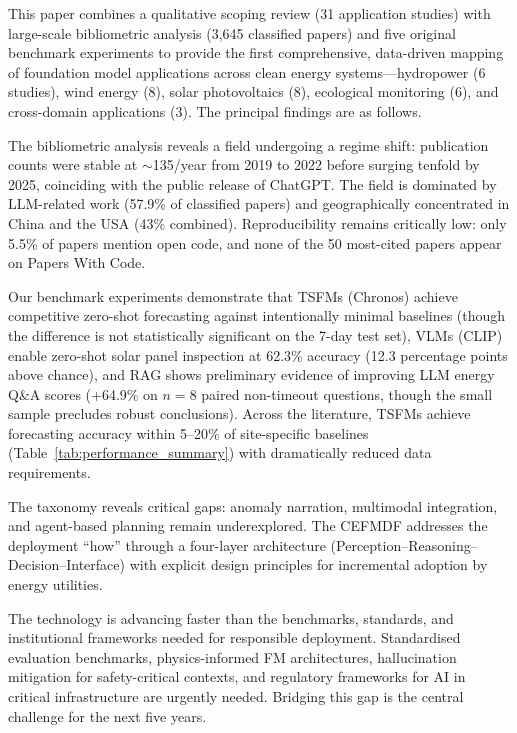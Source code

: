 \documentclass[preprint,12pt]{elsarticle}
\begin{document}
This paper combines a qualitative scoping review (31 application studies) with large-scale bibliometric analysis (3{,}645 classified papers) and five original benchmark experiments to provide the first comprehensive, data-driven mapping of foundation model applications across clean energy systems---hydropower (6 studies), wind energy (8), solar photovoltaics (8), ecological monitoring (6), and cross-domain applications (3). The principal findings are as follows.

The bibliometric analysis reveals a field undergoing a regime shift: publication counts were stable at ${\sim}$135/year from 2019 to 2022 before surging tenfold by 2025, coinciding with the public release of ChatGPT. The field is dominated by LLM-related work (57.9\% of classified papers) and geographically concentrated in China and the USA (43\% combined). Reproducibility remains critically low: only 5.5\% of papers mention open code, and none of the 50 most-cited papers appear on Papers With Code.

{ Our benchmark experiments demonstrate that TSFMs (Chronos) achieve competitive zero-shot forecasting against intentionally minimal baselines (though the difference is not statistically significant on the 7-day test set), VLMs (CLIP) enable zero-shot solar panel inspection at 62.3\% accuracy (12.3 percentage points above chance), and RAG shows preliminary evidence of improving LLM energy Q\&A scores (+64.9\% on $n=8$ paired non-timeout questions, though the small sample precludes robust conclusions). Across the literature, TSFMs achieve forecasting accuracy within 5--20\% of site-specific baselines (Table~\ref{tab:performance_summary}) with dramatically reduced data requirements.\par}

The taxonomy reveals critical gaps: anomaly narration, multimodal integration, and agent-based planning remain underexplored. The CEFMDF addresses the deployment ``how'' through a four-layer architecture (Perception--Reasoning--Decision--Interface) with explicit design principles for incremental adoption by energy utilities.

The technology is advancing faster than the benchmarks, standards, and institutional frameworks needed for responsible deployment. Standardised evaluation benchmarks, physics-informed FM architectures, hallucination mitigation for safety-critical contexts, and regulatory frameworks for AI in critical infrastructure are urgently needed. Bridging this gap is the central challenge for the next five years.
\end{document}
